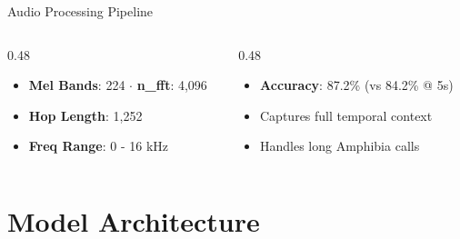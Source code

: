 \documentclass[aspectratio=169, 11pt]{beamer}
\begin{document}
\begin{frame}{Audio Processing Pipeline}
    \vspace{0.1cm}
    \begin{columns}[T, onlytextwidth]
        \begin{column}{0.48\textwidth}
            \begin{tcolorbox}[draculabox={Mel Spectrogram}]
                \scriptsize
                \begin{itemize}
                    \item \textbf{Mel Bands}: 224 $\cdot$ \textbf{n\_fft}: 4,096
                    \item \textbf{Hop Length}: 1,252
                    \item \textbf{Freq Range}: 0 - 16 kHz
                \end{itemize}
            \end{tcolorbox}
        \end{column}
        \begin{column}{0.48\textwidth}
            \begin{tcolorbox}[greenbox_tcb={Why 20s Chunks?}]
                \scriptsize
                \begin{itemize}
                    \item \textbf{Accuracy}: 87.2\% (vs 84.2\% @ 5s)
                    \item Captures full temporal context
                    \item Handles long Amphibia calls
                \end{itemize}
            \end{tcolorbox}
        \end{column}
    \end{columns}
\end{frame}

\section{Model Architecture}
\end{document}
